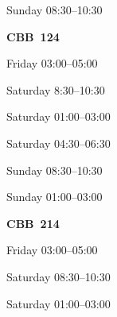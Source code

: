 \documentclass[11pt,oneside,letter]{article}
\begin{document}
\begin{center}
{\large Sunday 08:30--10:30}
\end{center}





\newpage
\begin{center}
{\LARGE {\bf CBB~124}}
\end{center}

\begin{center}
{\large Friday 03:00--05:00}
\end{center}


\begin{center}
{\large Saturday 8:30--10:30}
\end{center}


\begin{center}
{\large Saturday 01:00--03:00}
\end{center}


\begin{center}
{\large Saturday 04:30--06:30}
\end{center}


\begin{center}
{\large Sunday 08:30--10:30}
\end{center}


\begin{center}
{\large Sunday 01:00--03:00}
\end{center}








\newpage




\begin{center}
{\LARGE {\bf CBB~214}}
\end{center}

\begin{center}
{\large Friday 03:00--05:00}
\end{center}


\begin{center}
{\large Saturday 08:30--10:30}
\end{center}


\begin{center}
{\large Saturday 01:00--03:00}
\end{center}

\end{document}
